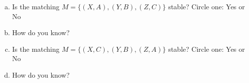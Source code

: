 \documentclass[11pt]{article}
\begin{document}
\begin{enumerate}
\begin{enumerate}[(a)]

\item Is the matching $M = \{(X, A), (Y, B), (Z, C)\}$ stable? Circle one: Yes or No

\item How do you know?
\vspace{1in}

\item Is the matching $M = \{(X, C), (Y, B), (Z, A)\}$ stable? Circle one: Yes or No

\item How do you know?
\vspace{1in}
    
\end{enumerate}

\end{enumerate}
\end{document}
